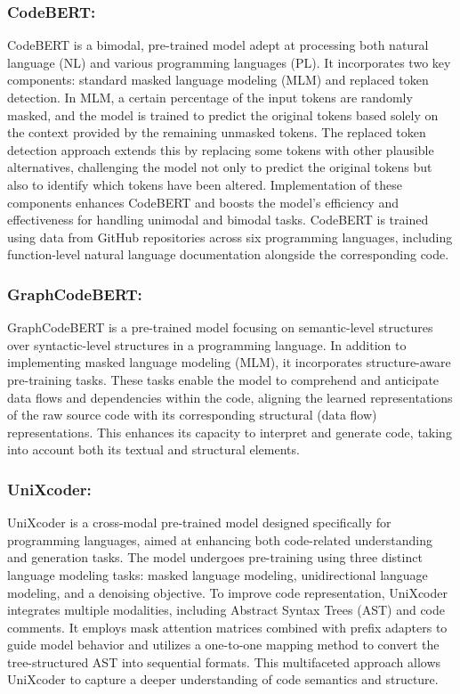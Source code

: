 \subsubsection{CodeBERT:} CodeBERT\cite{feng2020codebert} is a bimodal, pre-trained model adept at processing both natural language (NL) and various programming languages (PL).
It incorporates two key components: standard masked language modeling (MLM) and replaced token detection.
In MLM, a certain percentage of the input tokens are randomly masked, and the model is trained to predict the original tokens based solely on the context provided by the remaining unmasked tokens.
The replaced token detection approach extends this by replacing some tokens with other plausible alternatives, challenging the model not only to predict the original tokens but also to identify which tokens have been altered.
Implementation of these components enhances CodeBERT and boosts the model's efficiency and effectiveness for handling unimodal and bimodal tasks.
CodeBERT is trained using data from GitHub repositories across six programming languages, including function-level natural language documentation alongside the corresponding code.

\subsubsection{GraphCodeBERT:} GraphCodeBERT\cite{guo2020graphcodebert} is a pre-trained model focusing on semantic-level structures over syntactic-level structures in a programming language.
In addition to implementing masked language modeling (MLM), it incorporates structure-aware pre-training tasks.
These tasks enable the model to comprehend and anticipate data flows and dependencies within the code, aligning the learned representations of the raw source code with its corresponding structural (data flow) representations.
This enhances its capacity to interpret and generate code, taking into account both its textual and structural elements.

\subsubsection{UniXcoder:} UniXcoder\cite{guo2022unixcoder} is a cross-modal pre-trained model designed specifically for programming languages, aimed at enhancing both code-related understanding and generation tasks.
The model undergoes pre-training using three distinct language modeling tasks: masked language modeling, unidirectional language modeling, and a denoising objective.
To improve code representation, UniXcoder integrates multiple modalities, including Abstract Syntax Trees (AST) and code comments.
It employs mask attention matrices combined with prefix adapters to guide model behavior and utilizes a one-to-one mapping method to convert the tree-structured AST into sequential formats.
This multifaceted approach allows UniXcoder to capture a deeper understanding of code semantics and structure.

